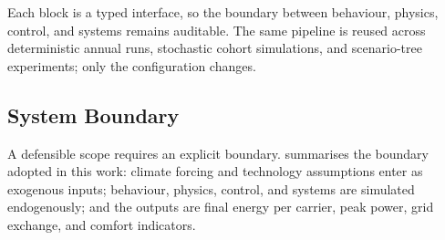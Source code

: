 Each block is a typed interface, so the boundary between behaviour, physics, control, and systems remains auditable. The same pipeline is reused across deterministic annual runs, stochastic cohort simulations, and scenario-tree experiments; only the configuration changes.


\subsection{System Boundary}
\label{sec:system_boundary}
 
A defensible scope requires an explicit boundary.  summarises the boundary adopted in this work: climate forcing and technology assumptions enter as exogenous inputs; behaviour, physics, control, and systems are simulated endogenously; and the outputs are final energy per carrier, peak power, grid exchange, and comfort indicators.
 
